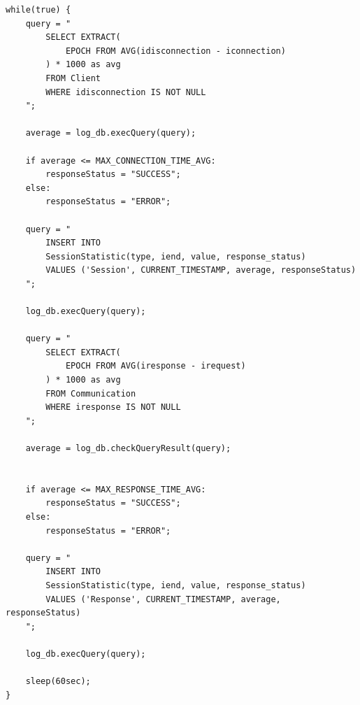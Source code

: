 \documentclass[12pt]{report}
\begin{document}
\begin{lstlisting}
while(true) {
    query = "
        SELECT EXTRACT(
            EPOCH FROM AVG(idisconnection - iconnection)
        ) * 1000 as avg
        FROM Client
        WHERE idisconnection IS NOT NULL
    ";

    average = log_db.execQuery(query);

    if average <= MAX_CONNECTION_TIME_AVG:
        responseStatus = "SUCCESS";
    else:
        responseStatus = "ERROR";

    query = "
        INSERT INTO
        SessionStatistic(type, iend, value, response_status)
        VALUES ('Session', CURRENT_TIMESTAMP, average, responseStatus)
    ";

    log_db.execQuery(query);

    query = "
        SELECT EXTRACT(
            EPOCH FROM AVG(iresponse - irequest)
        ) * 1000 as avg
        FROM Communication
        WHERE iresponse IS NOT NULL
    ";

    average = log_db.checkQueryResult(query);

    
    if average <= MAX_RESPONSE_TIME_AVG:
        responseStatus = "SUCCESS";
    else:
        responseStatus = "ERROR";

    query = "
        INSERT INTO
        SessionStatistic(type, iend, value, response_status)
        VALUES ('Response', CURRENT_TIMESTAMP, average, responseStatus)
    ";

    log_db.execQuery(query);

    sleep(60sec);
}

\end{lstlisting}
\end{document}

